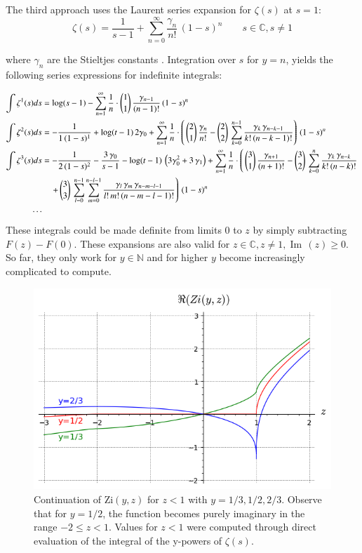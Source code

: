 \documentclass[a4paper,11pt,twoside]{amsart}
\newcommand\Zi{\mathrm{Zi}}
\renewcommand\Im{{\operatorname{Im\,}}}
\begin{document}
The third approach uses the Laurent series expansion for $\zeta(s)$ at $s=1$:
\begin{equation}\label{zetcom8}
  \zeta(s) = \frac{1}{s-1}+\sum_{n=0}^{\infty} \frac{\gamma_n}{n!}\,(1-s)^n \qquad s \in \mathbb{C}, s \ne 1
\end{equation}

where $\gamma_n$ are the Stieltjes constants \cite{stie}. Integration over $s$ for $y = n$, yields the following series expressions for indefinite integrals:

\begin{align}
\int \zeta^{1}(s) ds &= \log(s-1)\- - \sum_{n=1}^{\infty} \frac{1}{n}\cdot \binom{1}{1}\,\frac{\gamma_{n-1}}{(n-1)!}\,(1-s)^n \notag \\
\int \zeta^{2}(s) ds &= -\frac{1}{1\,(1-s)^1}+\log(t-1)\,2\gamma_0 + \sum_{n=1}^{\infty} \frac{1}{n}\cdot \left(\, \binom{2}{1}\,\frac{\gamma_{n}}{n!} -\binom{2}{2}\,\sum_{k=0}^{n-1} \frac{\gamma_k\,\gamma_{n-k-1}}{k!\,(n-k-1)!} \right)\,(1-s)^n \notag \\
\int \zeta^{3}(s) ds &= -\frac{1}{2\,(1-s)^2} - \frac{3\,\gamma_0}{s-1}- \log(t-1)\,\left(3\gamma_0^2+3\,\gamma_1\right) + \sum_{n=1}^{\infty} \frac{1}{n}\cdot \left(\, \binom{3}{1}\,\frac{\gamma_{n+1}}{(n+1)!} -\binom{3}{2}\,\sum_{k=0}^{n} \frac{\gamma_k\,\gamma_{n-k}}{k!\,(n-k)!} \right. \notag \\
& \quad \left. +\, \binom{3}{3}\,\sum_{l=0}^{n-1} \sum_{m=0}^{n-l-1} \frac{\gamma_l\,\gamma_m\,\gamma_{n-m-l-1}}{l!\,m!\,(n-m-l-1)!}  \right)\,(1-s)^n \notag \\
\cdots \notag 
\end{align}
These integrals could be made definite from limits $0$ to $z$ by simply subtracting $F(z) - F(0)$. These expansions are also valid for $z \in \mathbb{C}, z \ne 1, \Im(z) \ge 0$. So far, they only work for $y \in \mathbb{N}$ and for higher $y$ become increasingly complicated to compute.

\begin{figure}[H]
  \includegraphics[width=0.9\linewidth]{AncontZizx.png}
  \caption{Continuation of $\Zi(y,z)$ for $z < 1$ with $y=1/3, 1/2, 2/3$. Observe that for $y = 1/2$, the function becomes purely imaginary in the range $-2 \le z < 1$. Values for $z < 1$ were computed through direct evaluation of the integral of the y-powers of $\zeta(s)$.}
\end{figure}
\end{document}
